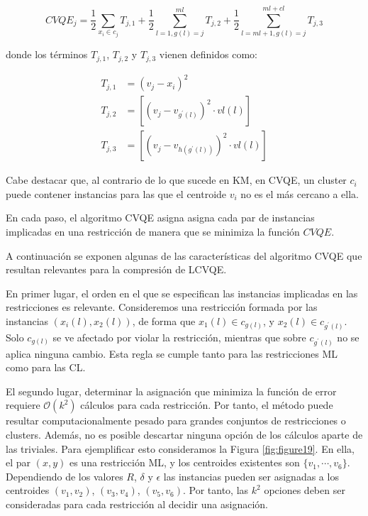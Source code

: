 \begin{equation}
CVQE_j = \frac{1}{2} \sum_{x_i \in c_j} T_{j,1} + 
\frac{1}{2} \sum_{l=1,g(l) = j}^{ml} T_{j,2} + 
\frac{1}{2} \sum_{l=ml + 1,g(l) = j}^{ml + cl} T_{j,3}
\label{eqn32}
\end{equation}

donde los términos $T_{j,1}$, $T_{j,2}$ y $T_{j,3}$ vienen definidos como: 

\begin{equation}
\begin{split}
T_{j,1} &= (v_j - x_i)^2\\
T_{j,2} &= \left[ (v_j - v_{g^\prime(l)})^2 \cdot vl(l) \right]\\
T_{j,3} &= \left[ (v_j - v_{h(g^\prime(l))})^2 \cdot vl(l) \right]
\end{split}
\label{eqn33}
\end{equation}

Cabe destacar que, al contrario de lo que sucede en \acf{KM}, en \acs{CVQE}, un cluster $c_i$ puede contener instancias para las que el centroide $v_i$ no es el más cercano a ella.

En cada paso, el algoritmo \acs{CVQE} asigna asigna cada par de instancias implicadas en una restricción de manera que se minimiza la función $CVQE$.

A continuación se exponen algunas de las características del algoritmo \acs{CVQE} que resultan relevantes para la compresión de \acs{LCVQE}.

En primer lugar, el orden en el que se especifican las instancias implicadas en las restricciones es relevante. Consideremos una restricción formada por las instancias $(x_i(l), x_2(l))$, de forma que $x_1(l) \in c_{g(l)}$, y $x_2(l) \in c_{g^\prime(l)}$. Solo $c_{g(l)}$ se ve afectado por violar la restricción, mientras que sobre $c_{g^\prime(l)}$ no se aplica ninguna cambio. Esta regla se cumple tanto para las restricciones \acf{ML} como para las \acf{CL}.

El segundo lugar, determinar la asignación que minimiza la función de error requiere $\mathcal{O}(k^2)$ cálculos para cada restricción. Por tanto, el método puede resultar computacionalmente pesado para grandes conjuntos de restricciones o clusters. Además, no es posible descartar ninguna opción de los cálculos aparte de las triviales. Para ejemplificar esto consideramos la Figura \ref{fig:figure19}. En ella, el par $(x,y)$ es una restricción \acs{ML}, y los centroides existentes son $\{v_1,\cdots,v_6\}$. Dependiendo de los valores $R$, $\delta$ y $\epsilon$ las instancias pueden ser asignadas a los centroides $(v_1, v_2)$, $(v_3, v_4)$, $(v_5, v_6)$. Por tanto, las $k^2$ opciones deben ser consideradas para cada restricción al decidir una asignación.

